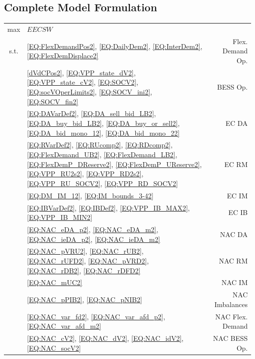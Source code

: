 \subsection{Complete Model Formulation}
\label{SEC:CompleteModelFormulation2}
{\small
\begin{tabularx}{\textwidth}{c >{\raggedright\arraybackslash}X r}

max & $EECSW$ & \\[0.5em]

s.t. & \eqref{EQ:FlexDemandPos2}, \eqref{EQ:DailyDem2}, \eqref{EQ:InterDem2}, \eqref{EQ:FlexDemDisplace2} & Flex. Demand Op. \\[0.2em]

& \eqref{dVdCPos2}, \eqref{EQ:VPP_state_dV2}, \eqref{EQ:VPP_state_cV2}, \eqref{EQ:SOCV2}, \eqref{EQ:socVOperLimits2}, \eqref{EQ:SOCV_ini2}, \eqref{EQ:SOCV_fin2} & BESS Op. \\[0.2em]

& \eqref{EQ:DAVarDef2}, \eqref{EQ:DA_sell_bid_LB2}, \eqref{EQ:DA_buy_bid_LB2}, \eqref{EQ:DA_buy_or_sell2}, \eqref{EQ:DA_bid_mono_12}, \eqref{EQ:DA_bid_mono_22} & EC DA \\[0.2em]

& \eqref{EQ:RVarDef2}, \eqref{EQ:RUcomp2}, \eqref{EQ:RDcomp2}, \eqref{EQ:FlexDemand_UB2}, \eqref{EQ:FlexDemand_LB2}, \eqref{EQ:FlexDemP_DReserve2}, \eqref{EQ:FlexDemP_UReserve2}, \eqref{EQ:VPP_RU2s2}, \eqref{EQ:VPP_RD2s2}, \eqref{EQ:VPP_RU_SOCV2}, \eqref{EQ:VPP_RD_SOCV2} & EC RM \\[0.2em]

& \eqref{EQ:DM_IM_12}, \eqref{EQ:IM_bounds_3-42} & EC IM \\[0.2em]

& \eqref{EQ:IBVarDef2}, \eqref{EQ:IBDef2}, \eqref{EQ:VPP_IB_MAX2}, \eqref{EQ:VPP_IB_MIN2} & EC IB \\[0.2em]

& \eqref{EQ:NAC_eDA_p2}, \eqref{EQ:NAC_eDA_m2}, \eqref{EQ:NAC_ieDA_p2}, \eqref{EQ:NAC_ieDA_m2} & NAC DA \\[0.2em]

& \eqref{EQ:NAC_pVRU2}, \eqref{EQ:NAC_rUB2}, \eqref{EQ:NAC_rUFD2}, \eqref{EQ:NAC_pVRD2}, \eqref{EQ:NAC_rDB2}, \eqref{EQ:NAC_rDFD2} & NAC RM \\[0.2em]

& \eqref{EQ:NAC_mUC2} & NAC IM \\[0.2em]

& \eqref{EQ:NAC_pPIB2}, \eqref{EQ:NAC_pNIB2} & NAC Imbalances \\[0.2em]

& \eqref{EQ:NAC_var_fd2}, \eqref{EQ:NAC_var_afd_p2}, \eqref{EQ:NAC_var_afd_m2} & NAC Flex. Demand \\[0.2em]

& \eqref{EQ:NAC_cV2}, \eqref{EQ:NAC_dV2}, \eqref{EQ:NAC_idV2}, \eqref{EQ:NAC_socV2} & NAC BESS Op. \\

\end{tabularx}
}

